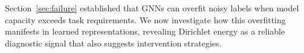 



Section~\ref{sec:failure} established that GNNs can overfit noisy labels when model capacity exceeds task requirements. We now investigate how this overfitting manifests in learned representations, revealing Dirichlet energy as a reliable diagnostic signal that also suggests intervention strategies.

